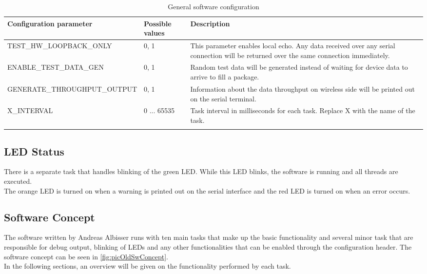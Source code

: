 \begin{center}
    \begin{longtable}{p{6cm}p{1cm}p{7cm}}
        \hline
        \textbf{Configuration parameter} & \textbf{Possible values} & \textbf{Description} \\
        \hline
        TEST\_HW\_LOOPBACK\_ONLY & 0, 1 & 
        This parameter enables local echo. Any data received over any serial connection will be returned over the same connection immediately.\\
        \hline
        ENABLE\_TEST\_DATA\_GEN &  0, 1 & 
        Random test data will be generated instead of waiting for device data to arrive to fill a package.\\
        \hline
        GENERATE\_THROUGHPUT\_OUTPUT &  0, 1 & 
        Information about the data throughput on wireless side will be printed out on the serial terminal.\\
        \hline
        X\_INTERVAL &  0 ... 65535 & 
        Task interval in milliseconds for each task. Replace X with the name of the task. \\
        \hline
        \caption{General software configuration}
        \label{tab:tabSpecificConfigArduino}    
    \end{longtable}
\end{center}
%
%
\subsection{LED Status}
There is a separate task that handles blinking of the green LED. While this LED blinks, the software is running and all threads are executed.\\
The orange LED is turned on when a warning is printed out on the serial interface and the red LED is turned on when an error occurs.\\
%
\subsection{Software Concept}
The software written by Andreas Albisser runs with ten main tasks that make up the basic functionality and several minor task that are responsible for debug output, blinking of LEDs and any other functionalities that can be enabled through the configuration header. The software concept can be seen in \autoref{fig:picOldSwConcept}. \\
%
In the following sections, an overview will be given on the functionality performed by each task.
